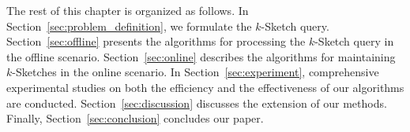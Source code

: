 %
%

The rest of this chapter is organized as follows. In Section~\ref{sec:problem_definition}, we formulate the $k$-Sketch query. Section~\ref{sec:offline} presents the algorithms for processing the $k$-Sketch query in the offline scenario. Section~\ref{sec:online} describes the algorithms for
maintaining $k$-Sketches in the online scenario.
In Section~\ref{sec:experiment}, comprehensive experimental studies on both the efficiency and the effectiveness of our algorithms are conducted.
Section~\ref{sec:discussion} discusses the extension of our methods. Finally,
Section~\ref{sec:conclusion} concludes our paper.
